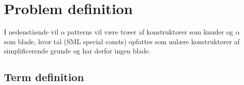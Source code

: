 \documentclass[oneside]{memoir}
\theoremstyle{definition}
\begin{document}
\section{Problem definition}





I nedenstående vil $\alpha$ patterns vil være træer af konstruktører som knuder og $\alpha$ som
blade, hvor tal (SML special consts) opfattes som nulære konstruktører af
simplificerende grunde og har derfor ingen blade.

\subsection{Term definition}
\label{sec:term-definition} 
\end{document}
